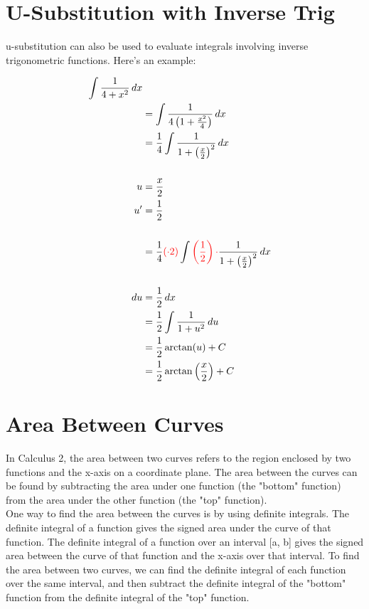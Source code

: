 \newpage

\section{U-Substitution with Inverse Trig}
\noindent u-substitution can also be used to evaluate integrals involving 
inverse trigonometric functions. Here's an example:

\begin{framed}
  \begin{align*}
    \int \frac{1}{4+x^2} \, dx\\
    &= \int \frac{1}{4\left(1+\frac{x^2}{4}\right)} \, dx\\
    &= \frac{1}{4} \int \frac{1}{1 + \left(\frac{x}{2}\right)^2} \, dx\\\\
    u&=\frac{x}{2}\\
    u'&=\frac{1}{2}\\\\
    &= \frac{1}{4} \textcolor{red}{(\cdot 2)} \int 
    \textcolor{red}{\left(\frac{1}{2}\right) \cdot }\frac{1}{1 
    + \left(\frac{x}{2}\right)^2} \, dx\\\\
    du &= \frac{1}{2} \, dx\\
    &= \frac{1}{2} \int \frac{1}{1+u^2} \, du\\
    &= \frac{1}{2} \operatorname{arctan} (u) + C\\
    &= \frac{1}{2} \operatorname{arctan} \left(\frac{x}{2}\right) + C
    \end{align*}
\end{framed}

\section{Area Between Curves}
In Calculus 2, the area between two curves refers to the region enclosed by two 
functions and the x-axis on a coordinate plane. The area between the curves can 
be found by subtracting the area under one function (the "bottom" function) from 
the area under the other function (the "top" function).\\

One way to find the area between the curves is by using definite integrals. The 
definite integral of a function gives the signed area under the curve of that 
function. The definite integral of a function over an interval [a, b] gives the 
signed area between the curve of that function and the x-axis over that 
interval. To find the area between two curves, we can find the definite integral 
of each function over the same interval, and then subtract the definite integral 
of the "bottom" function from the definite integral of the "top" function.\\

